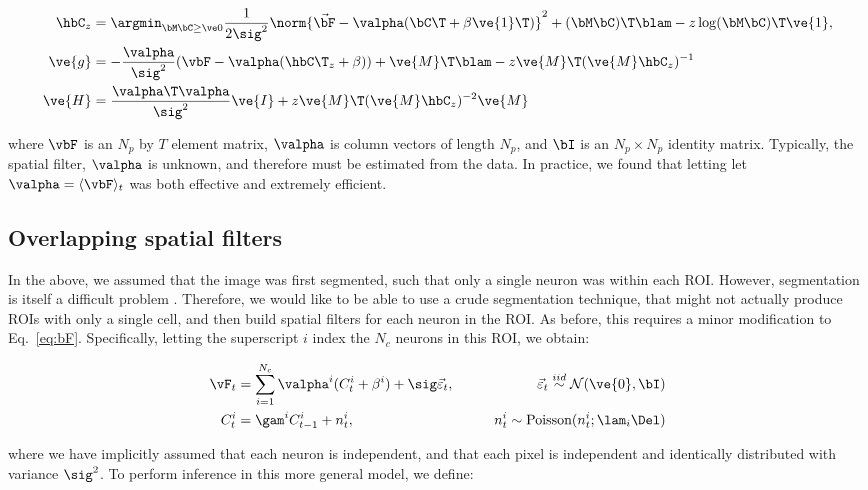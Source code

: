 \begin{align} 
\hbC_{\zzz} 
&= \az  \frac{1}{2 \sig^2} \norm{\vec{\bF} - \valpha (\bC\T +\beta\ve{1}\T)}^2 + (\bM \bC )\T \blam  - \zzz \log(\bM \bC)\T\ve{1},  \label{eq:eta4}\\
\ve{g} &= -\frac{\valpha}{\sig^2}(\vbF -\valpha({\hbC\T}_{\zzz} + \beta)) + \ve{M}\T\blam - \zzz \ve{M}\T (\ve{M} \hbC_{\zzz})^{-1} \label{eq:g2} \\
\ve{H} &= \frac{\valpha\T \valpha}{\sig^2} \ve{I} + \zzz \ve{M}\T (\ve{M} \hbC_{\zzz})^{-2} \ve{M} \label{eq:H2}
\end{align}

\noindent where $\vbF$ is an $N_p$ by $T$ element matrix, $\valpha$ is column vectors of length $N_p$, and $\bI$ is an $N_p \times N_p$ identity matrix.  Typically, the spatial filter, $\valpha$ is unknown, and therefore must be estimated from the data.  In practice, we found that letting let $\valpha=\langle \vbF \rangle_t$ was both effective and extremely efficient.




\subsection{Overlapping spatial filters} \label{sec:methods:overlapping}

In the above, we assumed that the image was first segmented, such that only a single neuron was within each ROI.  However, segmentation is itself a difficult problem \cite{}.  Therefore, we would like to be able to use a crude segmentation technique, that might not actually produce ROIs with only a single cell, and then build spatial filters for each neuron in the ROI.  As before, this requires a minor modification to Eq.~\eqref{eq:bF}.  Specifically, letting the superscript $i$ index the $N_c$ neurons in this ROI, we obtain:  

\begin{align}
\vF_t &= \sum_{i=1}^{N_c}\valpha^i (C^i_t + \beta^i) +  \sig\vec{\varepsilon}_t, \qquad &\vec{\varepsilon}_t \overset{iid}{\sim} \mathcal{N}(\ve{0},\bI)   \\
C^i_t &= \gam^i C^i_{t-1} + n^i_t, & n^i_t \sim \text{Poisson}(n^i_t; \lam_i \Del)
\end{align}

\noindent where we have implicitly assumed that each neuron is independent, and that each pixel is independent and identically distributed with variance $\sig^2$.  To perform inference in this more general model, we define:

